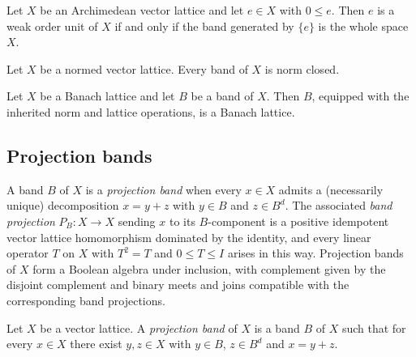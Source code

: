 \begin{theorem}
\label{thm:weakOrderUnit-iff-generated-singleton-eq-top}
\leanok
{}
Let $X$ be an Archimedean vector lattice and let $e \in X$ with
$0 \le e$. Then $e$ is a weak order unit of $X$ if and only if the
band generated by $\{e\}$ is the whole space $X$.
\end{theorem}

\begin{theorem}
\label{thm:band-isClosed-coe}
\leanok
{}
Let $X$ be a normed vector lattice. Every band of $X$ is norm closed.
\end{theorem}

\begin{lemma}
\label{lem:band-instBanachLatticeSubtype}
\leanok
{}
Let $X$ be a Banach lattice and let $B$ be a band of $X$. Then $B$,
equipped with the inherited norm and lattice operations, is a Banach
lattice.
\end{lemma}

\subsection{Projection bands}

A band $B$ of $X$ is a \emph{projection band} when every $x \in X$
admits a (necessarily unique) decomposition $x = y + z$ with $y \in B$
and $z \in B^d$. The associated \emph{band projection}
$P_B \colon X \to X$ sending $x$ to its $B$-component is a positive
idempotent vector lattice homomorphism dominated by the identity, and
every linear operator $T$ on $X$ with $T^2 = T$ and $0 \le T \le I$
arises in this way. Projection bands of $X$ form a Boolean algebra
under inclusion, with complement given by the disjoint complement and
binary meets and joins compatible with the corresponding band
projections.

\begin{definition}
\label{def:projectionBand}
\leanok
{}
Let $X$ be a vector lattice. A \emph{projection band} of $X$ is a
band $B$ of $X$ such that for every $x \in X$ there exist $y, z \in X$
with $y \in B$, $z \in B^d$ and $x = y + z$.
\end{definition}

